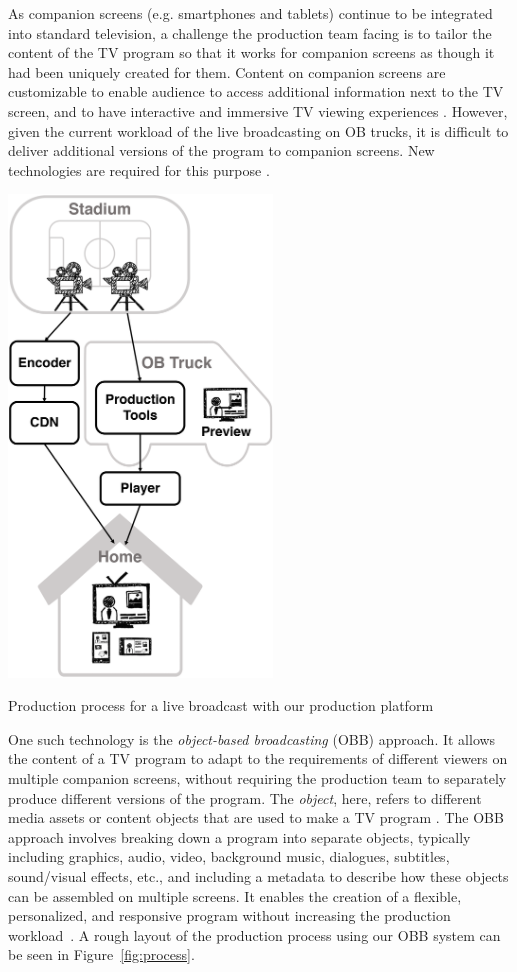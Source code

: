 \documentclass[sigchi-a, authorversion]{acmart}
\begin{document}
As companion screens (e.g. smartphones and tablets) continue to be integrated
into standard television, a challenge the production team facing is to tailor
the content of the TV program so that it works for companion screens as though
it had been uniquely created for them. Content on companion screens are
customizable to enable audience to access additional information next to the TV
screen, and to have interactive and immersive TV viewing
experiences \cite{bentley2017, dowell2015}. However, given the current workload
of the live broadcasting on OB trucks, it is difficult to deliver additional
versions of the program to companion screens. New technologies are required for
this purpose \cite{Li:2018_TVX, armstrong2014}.

\begin{marginfigure}
    \includegraphics[width=7cm]{Figures/process.png}
    \caption{Production process for a live broadcast with our production platform}
    \label{fig:process}
\end{marginfigure}

One such technology is the \emph{object-based broadcasting} (OBB) approach.
It allows the content of a TV program to
adapt to the requirements of different viewers on multiple companion screens,
without requiring the production team to separately produce different versions
of the program. The \emph{object}, here, refers to different media assets or content
objects that are used to make a TV program \cite{armstrong2014}. The OBB approach
involves breaking down a program into separate objects, typically including
graphics, audio, video, background music, dialogues, subtitles, sound/visual
effects, etc., and including a metadata to describe how these objects can be
assembled on multiple screens. It enables the creation of a flexible, personalized,
and responsive program without increasing the production
workload~\cite{kegel2017, williams2016}. A rough layout of the production process
using our OBB system can be seen in Figure~\ref{fig:process}.
\end{document}
